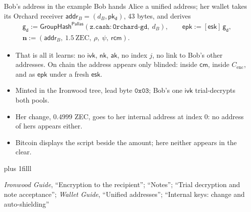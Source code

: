 \documentclass[aspectratio=169,11pt]{beamer}
\newcommand{\Pallas}{\ensuremath{\mathsf{Pallas}}}
\newcommand{\cmsym}{\ensuremath{\mathsf{cm}}}
\newcommand{\gd}{\ensuremath{\mathsf{g_d}}}
\newcommand{\pkd}{\ensuremath{\mathsf{pk_d}}}
\newcommand{\aksym}{\ensuremath{\mathsf{ak}}}
\newcommand{\nksym}{\ensuremath{\mathsf{nk}}}
\newcommand{\ivk}{\ensuremath{\mathsf{ivk}}}
\newcommand{\rcm}{\ensuremath{\mathsf{rcm}}}
\newcommand{\esk}{\ensuremath{\mathsf{esk}}}
\newcommand{\epk}{\ensuremath{\mathsf{epk}}}
\newcommand{\GroupHash}{\ensuremath{\mathsf{GroupHash}}}
\newcommand{\src}[1]{\par\vskip0pt plus 1filll
  {\fontsize{6}{7.2}\selectfont\color{arbdim}\raggedright #1\par}}
\begin{document}
\begin{frame}{Bob's address in the example}
Bob hands Alice a unified address; her wallet takes its Orchard receiver
$\mathsf{addr}_B = (d_B, \pkd)$, 43 bytes, and derives
\begin{gather*}
\gd := \GroupHash^{\Pallas}(\mathtt{z.cash:Orchard\text{-}gd},\ d_B),
\qquad \epk := [\esk]\,\gd, \\
\mathbf{n} := (\mathsf{addr}_B,\ 1.5\ \text{ZEC},\ \rho,\ \psi,\ \rcm).
\end{gather*}
\begin{itemize}
  \item That is all it learns: no \ivk, \nksym, \aksym, no index $j$, no
    link to Bob's other addresses. On chain the address appears only
    blinded: inside \cmsym, inside $C_{\mathrm{enc}}$, and as \epk{} under
    a fresh \esk.
  \item Minted in the Ironwood tree, lead byte $\mathtt{0x03}$; Bob's one
    \ivk{} trial-decrypts both pools.
  \item Her change, $0.4999$ ZEC, goes to her internal address at index
    $0$: no address of hers appears either.
  \item Bitcoin displays the script beside the amount; here neither
    appears in the clear.
\end{itemize}
\src{\emph{Ironwood Guide}, ``Encryption to the recipient''; ``Notes''; ``Trial
decryption and note acceptance''; \emph{Wallet Guide}, ``Unified addresses'';
``Internal keys: change and auto-shielding''}
\end{frame}
\end{document}
